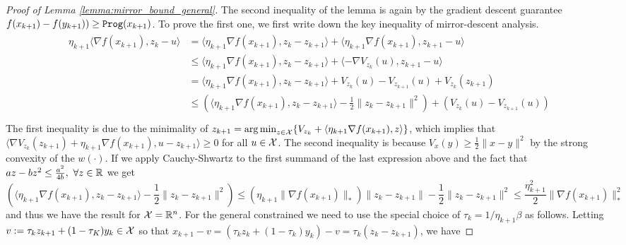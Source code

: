 \begin{proof}[Proof of Lemma \ref{lemma:mirror_bound_general}]
    The second inequality of the lemma is again by the gradient descent guarantee $f(x_{k+1}) - f(y_{k+1})) \geq {\tt{Prog}}(x_{k+1})$. To prove the first one, we first write down the key inequality of mirror-descent analysis. 
\begin{align*}\label{actual_regret_linear_coupling}
    \begin{aligned}
        \eta_{k+1} \langle \nabla f(x_{k+1}), z_{k} - u \rangle &= \langle \eta_{k+1} \nabla f(x_{k+1}), z_k - z_{k+1} \rangle + \langle \eta_{k+1} \nabla f(x_{k+1}), z_{k+1} - u \rangle \\
                                                                &\leq  \langle \eta_{k+1} \nabla f(x_{k+1}), z_k - z_{k+1} \rangle + \langle -\nabla V_{z_k}(u), z_{k+1} - u \rangle \\
                                                                &=  \langle \eta_{k+1} \nabla f(x_{k+1}), z_k - z_{k+1} \rangle + V_{z_k}(u) - V_{z_{k+1}}(u) + V_{z_k}(z_{k+1}) \\
                                                                &\leq  \left( \langle \eta_{k+1} \nabla f(x_{k+1}), z_k - z_{k+1} \rangle - \frac{1}{2}\|z_k - z_{k+1}\|^2 \right)  +  \left( V_{z_k}(u) - V_{z_{k+1}}(u) \right) \\
    \end{aligned}
\end{align*}
The first inequality is due to the minimality of $z_{k+1} = \operatorname*{arg\,min}_{z\in\mathcal{X}} \{V_{z_k} + \langle \eta_{k+1} \nabla f(x_{k+1}), z \rangle\}$, which implies that  $\langle \nabla V_{z_k} (z_{k+1}) + \eta_{k+1} \nabla f(x_{k+1}), u-z_{k+1} \rangle \geq 0 $ for all $u \in \mathcal{X}$. The second inequality is because $V_x(y) \geq \frac{1}{2} \|x-y\|^2$ by the strong convexity of the $w(\cdot)$. If we apply Cauchy-Shwartz to the first summand of the last expression above and the fact that $az-bz^2 \leq \frac{a^2}{4b}, \ \forall z \in \mathbb{R}$ we get
\[
    \left( \langle \eta_{k+1} \nabla f(x_{k+1}), z_k - z_{k+1} \rangle - \frac{1}{2}\|z_k - z_{k+1}\|^2 \right) \leq \left(\eta_{k+1}\|\nabla f(x_{k+1})\|_\ast \right) \|z_k - z_{k+1}\| - \frac{1}{2}\|z_k - z_{k+1}\|^2 \leq \frac{\eta_{k+1}^2}{2} \|\nabla f(x_{k+1})\|_\ast^2
\]
and thus we have the result for $\mathcal{X} = \mathbb{R}^n$. For the general constrained we need to use the special choice of $\tau_k = 1/\eta_{k+1} \beta$ as follows. Letting $v:= \tau_k z_{k+1} + (1-\tau_K) y_k \in \mathcal{X}$ so that $x_{k+1} - v = (\tau_k z_k + (1-\tau_k)y_k) -v = \tau_k(z_k-z_{k+1})$, we have

\end{proof}
